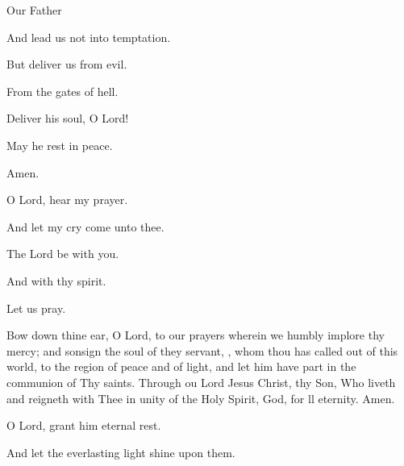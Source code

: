 Our Father 

\rubric{\Vbar} And lead us not into temptation.

\rubric{\Rbar} But deliver us from evil.

\rubric{\Vbar} From the gates of hell.

\rubric{\Rbar} Deliver his soul, O Lord!

\rubric{\Vbar} May he rest in peace.

\rubric{\Rbar} Amen.

\rubric{\Vbar} O Lord, hear my prayer.

\rubric{\Rbar} And let my cry come unto thee.

\rubric{\Vbar} The Lord be with you.

\rubric{\Rbar} And with thy spirit.

Let us pray.

Bow down thine ear, O Lord, to our prayers wherein we humbly implore thy mercy; and sonsign the soul of they servant, , whom thou has called out of this world, to the region of peace and of light, and let him have part in the communion of Thy saints. Through ou Lord Jesus Christ, thy Son, Who liveth and reigneth with Thee in unity of the Holy Spirit, God, for ll eternity. \rubric{\Rbar} Amen.

\rubric{\Vbar} O Lord, grant him eternal rest.

\rubric{\Rbar} And let the everlasting light shine upon them.